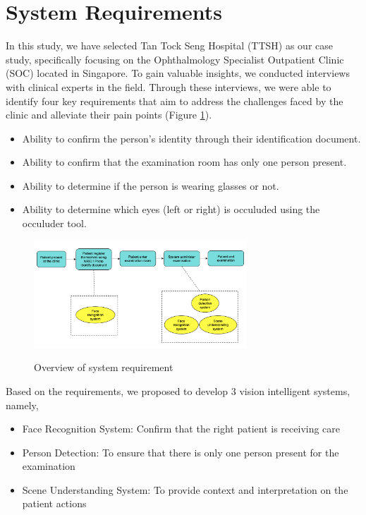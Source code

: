 \documentclass{article}
\begin{document}
\section{System Requirements}
In this study, we have selected Tan Tock Seng Hospital (TTSH) as our case study, specifically focusing on the Ophthalmology Specialist Outpatient Clinic (SOC) located in Singapore. To gain valuable insights, we conducted interviews with clinical experts in the field. Through these interviews, we were able to identify four key requirements that aim to address the challenges faced by the clinic and alleviate their pain points (Figure \ref{system-requirement}).

\begin{itemize}
\item Ability to confirm the person's identity through their identification document.
\item Ability to confirm that the examination room has only one person present.
\item Ability to determine if the person is wearing glasses or not.
\item Ability to determine which eyes (left or right) is occuluded using the occuluder tool. 
\end{itemize}

\begin{figure}[tbh]
    \begin{center}
        \includegraphics[width=8cm]{solution-overview.png}\
        \caption{Overview of system requirement \label{system-requirement}} 
    \end{center}
\end{figure}

Based on the requirements, we proposed to develop 3 vision intelligent systems, namely,

\begin{itemize}
\item Face Recognition System: Confirm that the right patient is receiving care
\item Person Detection: To ensure that there is only one person present for the examination
\item Scene Understanding System: To provide context and interpretation on the patient actions
\end{itemize}
\end{document}

